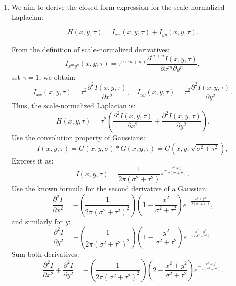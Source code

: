 \documentclass[12pt]{article}
\begin{document}
\begin{enumerate}[label=\roman*., leftmargin=1cm]
    \item
We aim to derive the closed-form expression for the scale-normalized Laplacian:

\begin{equation}
    H(x,y,\tau) = I_{xx}(x,y,\tau) + I_{yy}(x,y,\tau).
\end{equation}

From the definition of scale-normalized derivatives:
\begin{equation}
    I_{x^m y^n}(x, y, \tau) = \tau^{\gamma(m+n)} \frac{\partial^{m+n} I(x,y,\tau)}{\partial x^m \partial y^n},
\end{equation}
set \( \gamma = 1 \), we obtain:
\begin{equation}
    I_{xx}(x,y,\tau) = \tau^2 \frac{\partial^2 I(x,y,\tau)}{\partial x^2}, \quad
    I_{yy}(x,y,\tau) = \tau^2 \frac{\partial^2 I(x,y,\tau)}{\partial y^2}.
\end{equation}
Thus, the scale-normalized Laplacian is:
\begin{equation}
    H(x,y,\tau) = \tau^2 \left( \frac{\partial^2 I(x,y,\tau)}{\partial x^2} + \frac{\partial^2 I(x,y,\tau)}{\partial y^2} \right).
\end{equation}
Use the convolution property of Gaussians:
\begin{equation}
    I(x,y,\tau) = G(x,y,\sigma) * G(x,y,\tau) = G(x,y,\sqrt{\sigma^2 + \tau^2}),
\end{equation}
Express it as:
\begin{equation}
    I(x,y,\tau) = \frac{1}{2\pi(\sigma^2 + \tau^2)} e^{-\frac{x^2 + y^2}{2(\sigma^2 + \tau^2)}}.
\end{equation}
Use the known formula for the second derivative of a Gaussian:
\begin{equation}
    \frac{\partial^2 I}{\partial x^2} = - \left(\frac{1}{2\pi (\sigma^2 + \tau^2)^2}\right) \left(1 - \frac{x^2}{\sigma^2 + \tau^2} \right) e^{-\frac{x^2 + y^2}{2(\sigma^2 + \tau^2)}},
\end{equation}
and similarly for \( y \):
\begin{equation}
    \frac{\partial^2 I}{\partial y^2} = - \left(\frac{1}{2\pi (\sigma^2 + \tau^2)^2}\right) \left(1 - \frac{y^2}{\sigma^2 + \tau^2} \right) e^{-\frac{x^2 + y^2}{2(\sigma^2 + \tau^2)}}.
\end{equation}
Sum both derivatives:
\begin{equation}
    \frac{\partial^2 I}{\partial x^2} + \frac{\partial^2 I}{\partial y^2} = - \left(\frac{1}{2\pi (\sigma^2 + \tau^2)^2}\right) \left(2 - \frac{x^2 + y^2}{\sigma^2 + \tau^2} \right) e^{-\frac{x^2 + y^2}{2(\sigma^2 + \tau^2)}}.

\end{equation}
\end{enumerate}
\end{document}
